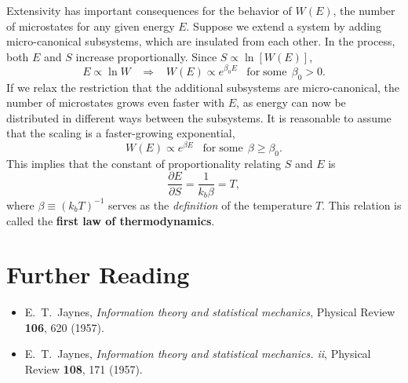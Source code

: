 \documentclass[pra,12pt]{revtex4}
\begin{document}
Extensivity has important consequences for the behavior of $W(E)$, the
number of microstates for any given energy $E$.  Suppose we extend a
system by adding micro-canonical subsystems, which are insulated from
each other.  In the process, both $E$ and $S$ increase proportionally.
Since $S \propto \ln[W(E)]$,
\begin{equation}
  E \propto \ln W \;\;\;\Rightarrow \;\;\;W(E) \propto e^{\beta_0 E} \;\;\; \mathrm{for\;some}\;\, \beta_0 > 0.
\end{equation}
If we relax the restriction that the additional subsystems are
micro-canonical, the number of microstates grows even faster with $E$,
as energy can now be distributed in different ways between the
subsystems.  It is reasonable to assume that the scaling is a
faster-growing exponential,
\begin{equation}
  W(E) \propto e^{\beta E} \;\;\; \mathrm{for\;some}\;\, \beta \ge \beta_0.
\end{equation}
This implies that the constant of proportionality relating
$S$ and $E$ is
\begin{equation}
  \frac{\partial E}{\partial S} = \frac{1}{k_b \beta} = T,
\end{equation}
where $\beta \equiv (k_bT)^{-1}$ serves as the \textit{definition} of
the temperature $T$.  This relation is called the \textbf{first law of
  thermodynamics}.

\section*{Further Reading}

\begin{itemize}
\item E.~T.~Jaynes, \textit{Information theory and statistical
  mechanics}, Physical Review \textbf{106}, 620 (1957).
\label{cite:jaynes}

\item E.~T.~Jaynes, \textit{Information theory and statistical
  mechanics. ii}, Physical Review \textbf{108}, 171 (1957).
\label{cite:jaynes2}
\end{itemize}
\end{document}
